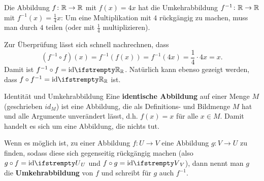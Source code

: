\documentclass[../../main.tex]{subfiles}
\begin{document}
\begin{example}{}
    Die Abbildung $f\colon\mathbb{R}\rightarrow\mathbb{R}$ mit $f(x)=4x$ hat die Umkehrabbildung $f^{-1}\colon\mathbb{R}\rightarrow\mathbb{R}$ mit $f^{-1}(x)=\frac{1}{4}x$: Um eine Multiplikation mit $4$ rückgängig zu machen, muss man durch $4$ teilen (oder mit $\frac{1}{4}$ multiplizieren).
    
    Zur Überprüfung lässt sich schnell nachrechnen, dass \[(f^{-1}\circ f)(x)=f^{-1}(f(x))=f^{-1}(4x)=\frac{1}{4}\cdot 4x=x.\] 
    Damit ist $f^{-1}\circ f=\ident[\Real]$. Natürlich kann ebenso gezeigt werden, dass $f\circ f^{-1}=\ident[\Real]$ ist.
\end{example}

\begin{nutshell}{Identität und Umkehrabbildung}
    \sloppy
    Eine \textbf{identische Abbildung} auf einer Menge $M$ (geschrieben $id_M$) ist eine Abbildung, die als Definitions- und Bildmenge $M$ hat und alle Argumente unverändert lässt, d.h. $f(x)=x$ für alle $x\in M$. Damit handelt es sich um eine Abbildung, die nichts tut.
    
    Wenn es möglich ist, zu einer Abbildung $f\colon U\rightarrow V$ eine Abbildung $g\colon V\rightarrow U$ zu finden, sodass diese sich gegenseitig rückgängig machen (also $g\circ f=\ident[U]$ und $f\circ g=\ident[V]$), dann nennt man $g$ die \textbf{Umkehrabbildung} von $f$ und schreibt für $g$ auch $f^{-1}$.
\end{nutshell}
\end{document}
